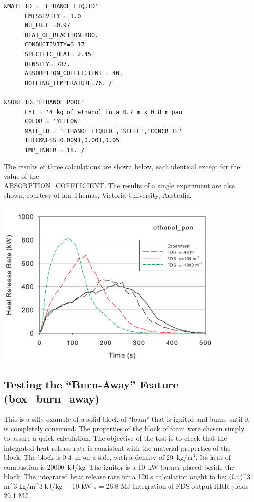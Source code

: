 \documentclass[11pt]{book}
\begin{document}
\scriptsize
\begin{verbatim}
&MATL ID = 'ETHANOL LIQUID'
      EMISSIVITY = 1.0
      NU_FUEL =0.97
      HEAT_OF_REACTION=880.
      CONDUCTIVITY=0.17
      SPECIFIC_HEAT= 2.45
      DENSITY= 787.
      ABSORPTION_COEFFICIENT = 40.
      BOILING_TEMPERATURE=76. /

&SURF ID='ETHANOL POOL'
      FYI = '4 kg of ethanol in a 0.7 m x 0.8 m pan'
      COLOR = 'YELLOW'
      MATL_ID = 'ETHANOL LIQUID','STEEL','CONCRETE'
      THICKNESS=0.0091,0.001,0.05
      TMP_INNER = 18. /
\end{verbatim} \normalsize

\noindent
The results of three calculations are shown below, each identical except for the value of the \\ {\ct ABSORPTION\_COEFFICIENT}. The results of a single experiment
are also shown, courtesy of Ian Thomas, Victoria University, Australia.


\begin{center}
\includegraphics[width=4.5in]{FIGURES/ethanol_pan_HRR}
\end{center}







\clearpage
\subsection{Testing the ``Burn-Away'' Feature ({\bf box\_burn\_away}) }

This is a silly example of a solid block of ``foam'' that is ignited
and burns until it is completely consumed.  The properties of the
block of foam were chosen simply to assure a quick calculation. The
objective of the test is to check that the integrated heat release
rate is consistent with the material properties of the block.  The
block is 0.4~m on a side, with a density of 20~kg/m$^3$. Its heat of
combustion is 20000~kJ/kg. The ignitor is a 10~kW burner placed beside
the block. The integrated heat release rate for a 120 s calculation
ought to be:
\be
(0.4)^3 \; \hbox{m}^3  \; \hbox{kg/m}^3
 \; \hbox{kJ/kg} + 10 \; \hbox{kW}  \; \hbox{s} =
26.8 \; \hbox{MJ}
\ee
Integration of FDS output HRR yields 29.1 MJ.
\end{document}
